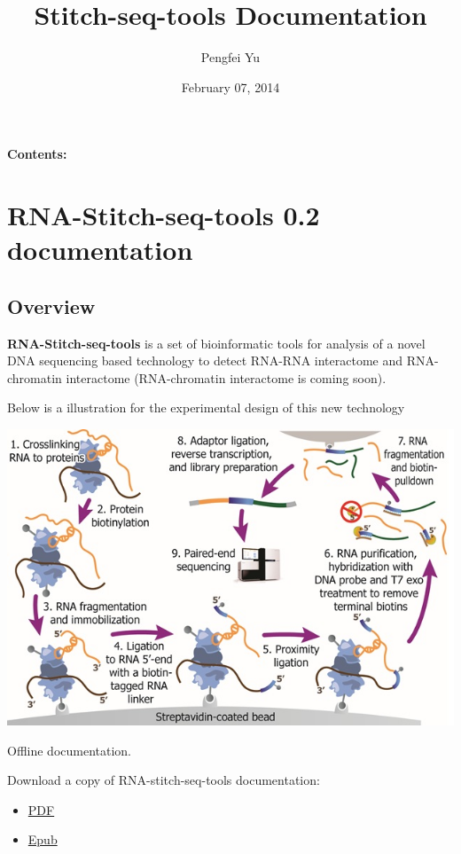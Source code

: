 \documentclass[letterpaper,10pt,english]{sphinxmanual}
\title{Stitch-seq-tools Documentation}
\date{February 07, 2014}
\author{Pengfei Yu}
\begin{document}
\maketitle
\tableofcontents
{}\label{index::doc}


\textbf{Contents:}


\chapter{RNA-Stitch-seq-tools 0.2 documentation}
\label{Stitch-seq-tools::doc}\label{Stitch-seq-tools:welcome-to-rna-stitch-seq-tools-s-documentation}\label{Stitch-seq-tools:rna-stitch-seq-tools-version-documentation}

\section{Overview}
\label{Stitch-seq-tools:overview}
\textbf{RNA-Stitch-seq-tools} is a set of bioinformatic tools for analysis of a novel DNA sequencing based technology to detect RNA-RNA interactome and RNA-chromatin interactome (RNA-chromatin interactome is coming soon).

Below is a illustration for the experimental design of this new technology

{\hfill\includegraphics{exp.jpg}\hfill}




Offline documentation.

Download a copy of RNA-stitch-seq-tools documentation:
\begin{itemize}
\item {} 
\href{https://media.readthedocs.org/pdf/stitch-seq-tools/latest/stitch-seq-tools.pdf}{PDF}

\item {} 
\href{https://media.readthedocs.org/epub/stitch-seq-tools/latest/stitch-seq-tools.epub}{Epub}

\end{itemize}
\end{document}
